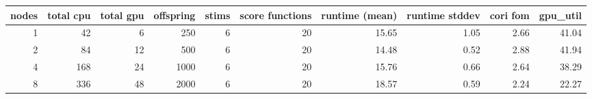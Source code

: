 \begin{tabular}{rrrrrrrrrr}
\toprule
 nodes &  total cpu &  total gpu &  offspring &  stims &  score functions & runtime (mean) & runtime stddev & cori fom & gpu\_util \\
\midrule
     1 &         42 &          6 &        250 &      6 &               20 &          15.65 &           1.05 &     2.66 &    41.04 \\
     2 &         84 &         12 &        500 &      6 &               20 &          14.48 &           0.52 &     2.88 &    41.94 \\
     4 &        168 &         24 &       1000 &      6 &               20 &          15.76 &           0.66 &     2.64 &    38.29 \\
     8 &        336 &         48 &       2000 &      6 &               20 &          18.57 &           0.59 &     2.24 &    22.27 \\
\bottomrule
\end{tabular}
